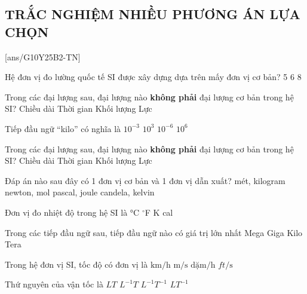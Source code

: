 \subsection{TRẮC NGHIỆM NHIỀU PHƯƠNG ÁN LỰA CHỌN}
\setcounter{ex}{0}
[ans/G10Y25B2-TN]
\begin{ex}
	Hệ đơn vị đo lường quốc tế SI được xây dựng dựa trên mấy đơn vị cơ bản?
	\choice
	{5}
	{6}
	{}
	{8}
	\loigiai{}
\end{ex}

\begin{ex}
	Trong các đại lượng sau, đại lượng nào \textbf{không phải} đại lượng cơ bản trong hệ SI?
	\choice
	{Chiều dài}
	{Thời gian}
	{Khối lượng}
	{\True Lực}
	\loigiai{}
\end{ex}

\begin{ex}
	Tiếp đầu ngữ “kilo” có nghĩa là
	\choice
	{$10^{-3}$}
	{\True $10^{3}$}
	{$10^{-6}$}
	{$10^{6}$}
	\loigiai{}
\end{ex}

\begin{ex}
	Trong các đại lượng sau, đại lượng nào \textbf{không phải} đại lượng cơ bản trong hệ SI?
	\choice
	{Chiều dài}
	{Thời gian}
	{Khối lượng}
	{\True Lực}
	\loigiai{}
\end{ex}

\begin{ex}
	Đáp án nào sau đây có 1 đơn vị cơ bản và 1 đơn vị dẫn xuất?
	\choice
	{mét, kilogram}
	{\True newton, mol}
	{pascal, joule}
	{candela, kelvin}
	\loigiai{}
\end{ex}

\begin{ex}
	Đơn vị đo nhiệt độ trong hệ SI là
	\choice
	{$\si{\celsius}$}
	{$^\circ$F}
	{\True K}
	{cal}
	\loigiai{}
\end{ex}

\begin{ex}
	Trong các tiếp đầu ngữ sau, tiếp đầu ngữ nào có giá trị lớn nhất
	\choice
	{Mega}
	{Giga}
	{Kilo}
	{\True Tera}
	\loigiai{}
\end{ex}

\begin{ex}
	Trong hệ đơn vị SI, tốc độ có đơn vị là
	\choice
	{$\si{\kilo\meter/\hour}$}
	{\True $\si{\meter/\second}$}
	{$\si{\text{dặm}/\hour}$}
	{$\si{ft/\second}$}
	\loigiai{}
\end{ex}

\begin{ex}
	Thứ nguyên của vận tốc là
	\choice
	{$LT$}
	{$L^{-1}T$}
	{$L^{-1}T^{-1}$}
	{\True $LT^{-1}$}
\end{ex}

